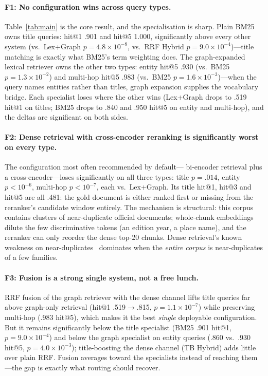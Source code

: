 \documentclass[runningheads]{llncs}
\begin{document}
\paragraph{F1: No configuration wins across query types.}
Table~\ref{tab:main} is the core result, and the specialisation is sharp.
Plain BM25 owns title queries: hit@1 .901 and hit@5 1.000, significantly
above every other system (vs.\ Lex+Graph $p{=}4.8{\times}10^{-8}$, vs.\
RRF Hybrid $p{=}9.0{\times}10^{-4}$)---title matching is exactly what BM25's
term weighting does. The graph-expanded lexical retriever owns the other two
types: entity hit@5 .930 (vs.\ BM25 $p{=}1.3{\times}10^{-2}$) and multi-hop
hit@5 .983 (vs.\ BM25 $p{=}1.6{\times}10^{-3}$)---when the query names
entities rather than titles, graph expansion supplies the vocabulary bridge.
Each specialist loses where the other wins (Lex+Graph drops to .519 hit@1 on
titles; BM25 drops to .840 and .950 hit@5 on entity and multi-hop), and the
deltas are significant on both sides.

\paragraph{F2: Dense retrieval with cross-encoder reranking is significantly
worst on every type.} The configuration most often recommended by default---
bi-encoder retrieval plus a cross-encoder---loses significantly on all three
types: title $p{=}.014$, entity $p{<}10^{-6}$, multi-hop $p{<}10^{-7}$,
each vs.\ Lex+Graph. Its title hit@1,
hit@3 and hit@5 are all .481: the gold document is either ranked first or
missing from the reranker's candidate window entirely. The mechanism is
structural: this corpus contains clusters of near-duplicate official
documents; whole-chunk embeddings dilute the few discriminative tokens (an
edition year, a place name), and the reranker can only reorder the dense
top-20 chunks. Dense retrieval's known weakness on
near-duplicates~\cite{beir} dominates when the \emph{entire corpus} is
near-duplicates of a few families.

\paragraph{F3: Fusion is a strong single system, not a free lunch.} RRF
fusion of the graph retriever with the dense channel lifts title queries far
above graph-only retrieval (hit@1 .519$\to$.815, $p{=}1.1{\times}10^{-7}$)
while preserving multi-hop (.983 hit@5), which makes it the best
\emph{single} deployable configuration. But it remains significantly below
the title specialist (BM25 .901 hit@1, $p{=}9.0{\times}10^{-4}$) and below
the graph specialist on entity queries (.860 vs.\ .930 hit@5,
$p{=}4.0{\times}10^{-3}$); title-boosting the dense channel (TB Hybrid)
adds little over plain RRF. Fusion averages toward the specialists instead
of reaching them---the gap is exactly what routing should recover.
\end{document}
